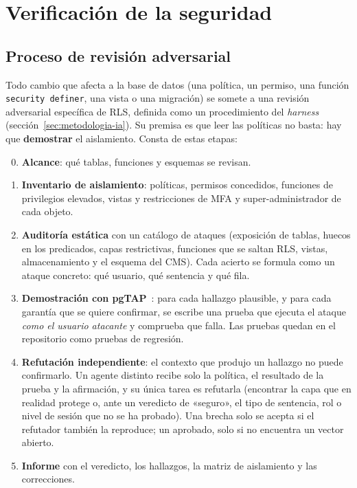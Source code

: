\section{Verificación de la seguridad}
\label{sec:verificacion-seguridad}

\subsection{Proceso de revisión adversarial}

Todo cambio que afecta a la base de datos (una política, un permiso, una
función \texttt{security definer}, una vista o una migración) se somete a una
revisión adversarial específica de RLS, definida como un procedimiento del
\textit{harness} (sección~\ref{sec:metodologia-ia}). Su premisa es que leer
las políticas no basta: hay que \textbf{demostrar} el aislamiento. Consta de
estas etapas:

\begin{enumerate}
  \setcounter{enumi}{-1}
  \item \textbf{Alcance}: qué tablas, funciones y esquemas se revisan.
  \item \textbf{Inventario de aislamiento}: políticas, permisos concedidos,
        funciones de privilegios elevados, vistas y restricciones de MFA y
        super-administrador de cada objeto.
  \item \textbf{Auditoría estática} con un catálogo de ataques (exposición de
        tablas, huecos en los predicados, capas restrictivas, funciones que
        se saltan RLS, vistas, almacenamiento y el esquema del CMS). Cada
        acierto se formula como un ataque concreto: qué usuario, qué
        sentencia y qué fila.
  \item \textbf{Demostración con pgTAP}~\cite{pgtap}: para cada hallazgo
        plausible, y para cada garantía que se quiere confirmar, se escribe
        una prueba que ejecuta el ataque \emph{como el usuario atacante} y
        comprueba que falla. Las pruebas quedan en el repositorio como
        pruebas de regresión.
  \item \textbf{Refutación independiente}: el contexto que produjo un
        hallazgo no puede confirmarlo. Un agente distinto recibe solo la
        política, el resultado de la prueba y la afirmación, y su única tarea
        es refutarla (encontrar la capa que en realidad protege o, ante un
        veredicto de «seguro», el tipo de sentencia, rol o nivel de sesión
        que no se ha probado). Una brecha solo se acepta si el refutador
        también la reproduce; un aprobado, solo si no encuentra un vector
        abierto.
  \item \textbf{Informe} con el veredicto, los hallazgos, la matriz de
        aislamiento y las correcciones.
\end{enumerate}

